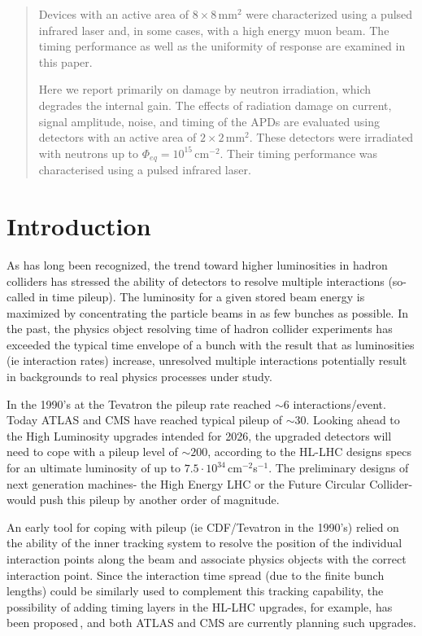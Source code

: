 \documentclass{article}
\begin{document}
\begin{abstract}
Devices with an active area of $8 \times 8$\,mm$^2$ were characterized using a pulsed infrared laser and, in some cases, with a high energy muon beam.
The timing performance as well as the uniformity of response are examined in this paper.

Here we report primarily on damage by neutron irradiation, which degrades the internal gain.
The effects of radiation damage on current, signal amplitude, noise, and timing of the APDs are evaluated using detectors with an active area of $2 \times 2$\,mm$^2$.
These detectors were irradiated with neutrons up to $\Phi_{eq} = 10^{15}$\,cm$^{-2}$.
Their timing performance was characterised using a pulsed infrared laser.

\end{abstract}

\clearpage

\tableofcontents

\section{Introduction}

As has long been recognized, the trend toward higher luminosities in hadron colliders has stressed the ability of detectors to resolve multiple interactions (so-called in time pileup). The luminosity for a given stored beam energy is maximized by concentrating the particle beams in as few bunches as possible. In the past, the physics object resolving time of hadron collider experiments has exceeded the typical time envelope of a bunch with the result that
as luminosities (ie interaction rates) increase, unresolved multiple interactions potentially result in backgrounds to real physics processes under study.

In the 1990's at the Tevatron the pileup rate reached $\sim6$ interactions/event. Today ATLAS and CMS have reached typical pileup of $\sim30$. Looking ahead to the High Luminosity upgrades intended for 2026, the upgraded detectors will need to cope with a pileup level of $\sim200$, according to the HL-LHC designs specs for an ultimate luminosity of up to $7.5 \cdot 10^{34}$\,cm$^{-2}$s$^{-1}$. The preliminary designs of next generation machines- the High Energy LHC or the Future Circular Collider- would push this pileup by another order of magnitude.

An early tool for coping with pileup (ie CDF/Tevatron in the 1990's) relied on the ability of the inner tracking system to resolve the position of the individual interaction points along the beam and associate physics objects with the correct 
interaction point. Since the interaction time spread (due to the finite bunch lengths) could be similarly used to complement this tracking capability, the possibility of adding timing layers in the HL-LHC upgrades, for example, has been proposed\,\cite{CHEF}, and both ATLAS and CMS are currently planning such upgrades.
\end{document}

